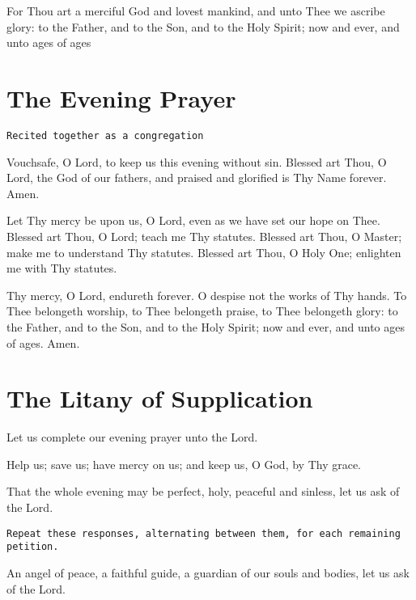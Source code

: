 \documentclass[twoside, letterpaper, 12pt]{report}
\newcommand{\instruction}[1]{%
  \texttt{\scriptsize{#1}}%
}
\newcommand{\centeredsection}[1]{%
  \needspace{10\baselineskip}%
  \section*{\centering{}#1}%
}
\begin{document}
\begin{priest}
\item For Thou art a merciful God and lovest mankind, and unto Thee we ascribe glory:
    to the Father, and to the Son, and to the Holy Spirit; now and ever, and unto ages of ages
\end{priest}


\centeredsection{The Evening Prayer}
\instruction{Recited together as a congregation}

Vouchsafe, O Lord, to keep us this evening without sin.
Blessed art Thou, O Lord, the God of our fathers,
and praised and glorified is Thy Name forever. Amen.

Let Thy mercy be upon us, O Lord, even as we have set our hope on Thee.
Blessed art Thou, O Lord; teach me Thy statutes. Blessed art Thou, O Master;
make me to understand Thy statutes.
Blessed art Thou, O Holy One; enlighten me with Thy statutes.

Thy mercy, O Lord, endureth forever. O despise not the works of Thy hands.
To Thee belongeth worship, to Thee belongeth praise, to Thee belongeth glory:
to the Father, and to the Son, and to the Holy Spirit;
now and ever, and unto ages of ages. Amen.

\centeredsection{The Litany of Supplication}

\begin{deacon}
\item Let us complete our evening prayer unto the Lord.
\end{deacon}

\begin{deacon}
\item Help us; save us; have mercy on us; and keep us, O God, by Thy grace.
\end{deacon}

\begin{deacon}
\item That the whole evening may be perfect, holy, peaceful and sinless,
    let us ask of the Lord.
\end{deacon}
\instruction{Repeat these responses, alternating between them, for each remaining petition.}


\begin{deacon}
\item An angel of peace, a faithful guide, a guardian of our souls and bodies,
    let us ask of the Lord.
\end{deacon}
\end{document}
